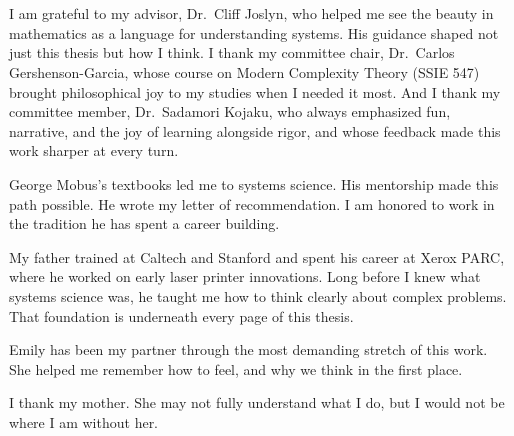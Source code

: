 \documentclass[12pt,oneside]{book}
\begin{document}
\chapter*{}
\begin{doublespace}

I am grateful to my advisor, Dr.\ Cliff Joslyn, who helped me see the beauty in mathematics as a language for understanding systems. His guidance shaped not just this thesis but how I think. I thank my committee chair, Dr.\ Carlos Gershenson-Garcia, whose course on Modern Complexity Theory (SSIE 547) brought philosophical joy to my studies when I needed it most. And I thank my committee member, Dr.\ Sadamori Kojaku, who always emphasized fun, narrative, and the joy of learning alongside rigor, and whose feedback made this work sharper at every turn.

George Mobus's textbooks led me to systems science. His mentorship made this path possible. He wrote my letter of recommendation. I am honored to work in the tradition he has spent a career building.

My father trained at Caltech and Stanford and spent his career at Xerox PARC, where he worked on early laser printer innovations. Long before I knew what systems science was, he taught me how to think clearly about complex problems. That foundation is underneath every page of this thesis.

Emily has been my partner through the most demanding stretch of this work. She helped me remember how to feel, and why we think in the first place.

I thank my mother. She may not fully understand what I do, but I would not be where I am without her.
\end{doublespace}
\end{document}
